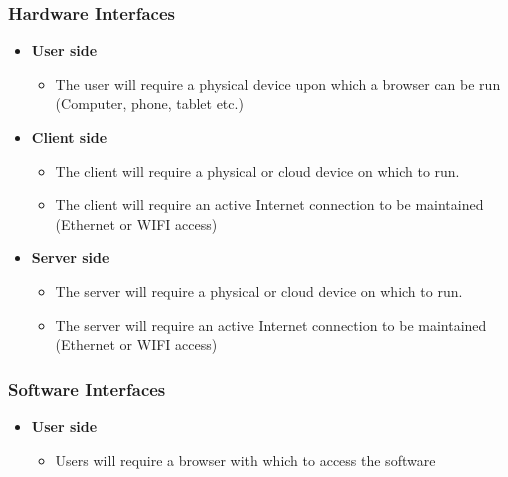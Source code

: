 \documentclass[a4paper,12pt]{article}
\begin{document}
            \subsubsection{Hardware Interfaces}
            
             	\begin{itemize}
            	\item \textbf{User side}
            	\begin{itemize}
            		\item The user will require a physical device upon which a browser can be run (Computer, phone, tablet etc.)
            	\end{itemize}
            \end{itemize}
            
            \begin{itemize}
            	\item \textbf{Client side}
            	\begin{itemize}
            		\item The client will require a physical or cloud device on which to run.
            		\item The client will require an active Internet connection to be maintained (Ethernet or WIFI access)
            	\end{itemize}
            \end{itemize}
            
            \begin{itemize}
            	\item \textbf{Server side}
            	\begin{itemize}
            		\item The server will require a physical or cloud device on which to run.
            		\item The server will require an active Internet connection to be maintained (Ethernet or WIFI access)
            	\end{itemize}
            \end{itemize}
            
            \subsubsection{Software Interfaces}
            
           	\begin{itemize}
            	\item \textbf{User side}
            	\begin{itemize}
            		\item Users will require a browser with which to access the software
            	\end{itemize}
            \end{itemize}
        
\end{document}
